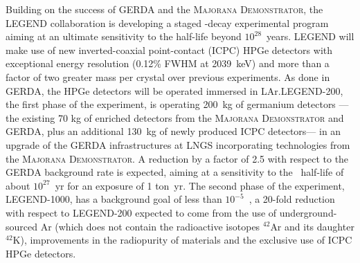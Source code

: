 Building on the success of GERDA and the \textsc{Majorana Demonstrator}, the LEGEND \cite{LEGEND:2021bnm} collaboration is developing a staged \bbonu-decay experimental program aiming at an ultimate sensitivity to the  half-life beyond $10^{28}$~years. LEGEND will make use of new inverted-coaxial point-contact (ICPC) HPGe detectors with exceptional energy resolution (0.12\% FWHM at 2039~keV) and more than a factor of two greater mass per crystal over previous experiments. As done in GERDA, the HPGe detectors will be operated immersed in LAr.LEGEND-200, the first phase of the experiment, is operating 200~kg of germanium detectors ---\thinspace the existing 70 kg of enriched detectors from the \textsc{Majorana Demonstrator} and GERDA, plus an additional 130~kg of newly produced ICPC detectors\thinspace--- in an upgrade of the GERDA infrastructures at LNGS incorporating technologies from the \textsc{Majorana Demonstrator}. A reduction by a factor of 2.5 with respect to the GERDA background rate is expected, aiming at a sensitivity to the \bbonu\ half-life of about $10^{27}$~yr for  an exposure of 1 ton~yr. The second phase of the experiment, LEGEND-1000, has a background goal of less than $10^{-5}$~\ckky, a 20-fold reduction with respect to LEGEND-200 expected to come from the use of underground-sourced Ar (which does not contain the radioactive isotopes $^{42}$Ar and its daughter $^{42}$K), improvements in the radiopurity of materials and the exclusive use of ICPC HPGe detectors.